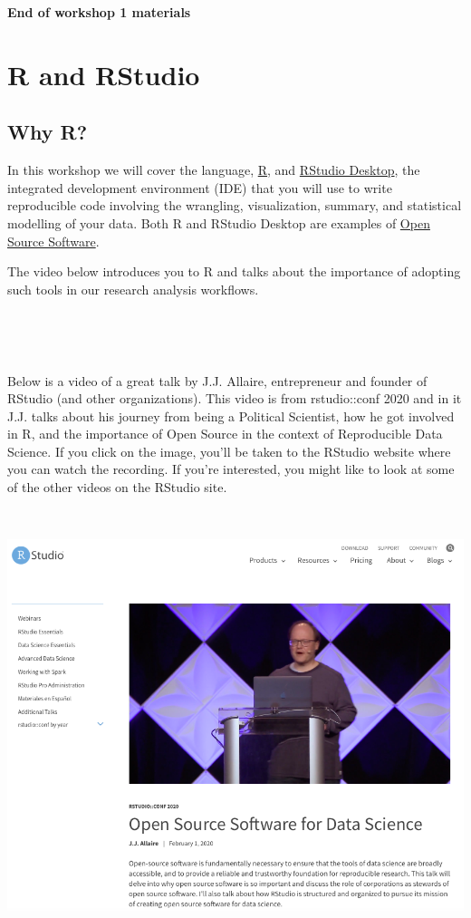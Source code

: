 \documentclass[
]{book}
\begin{document}
\textbf{End of workshop 1 materials}

\hypertarget{r-and-rstudio}{%
\chapter{R and RStudio}\label{r-and-rstudio}}

\hypertarget{why-r}{%
\section{Why R?}\label{why-r}}

In this workshop we will cover the language, \href{https://www.r-project.org/about.html}{R}, and \href{https://posit.co/products/open-source/rstudio}{RStudio Desktop}, the integrated development environment (IDE) that you will use to write reproducible code involving the wrangling, visualization, summary, and statistical modelling of your data. Both R and RStudio Desktop are examples of \href{https://opensource.com/resources/what-open-source}{Open Source Software}.

The video below introduces you to R and talks about the importance of adopting such tools in our research analysis workflows.

~~

~~

Below is a video of a great talk by J.J. Allaire, entrepreneur and founder of RStudio (and other organizations). This video is from rstudio::conf 2020 and in it J.J. talks about his journey from being a Political Scientist, how he got involved in R, and the importance of Open Source in the context of Reproducible Data Science. If you click on the image, you'll be taken to the RStudio website where you can watch the recording. If you're interested, you might like to look at some of the other videos on the RStudio site.

~~

\href{https://rstudio.com/resources/rstudioconf-2020/open-source-software-for-data-science/}{\includegraphics{images/jj_allaire.png}}
\end{document}
